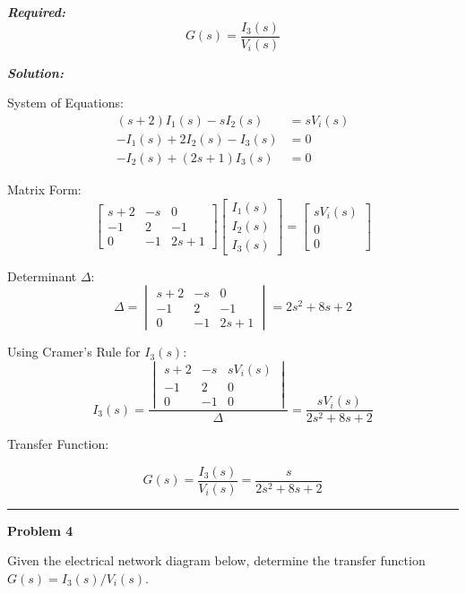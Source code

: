 \documentclass[11pt]{article}
\begin{document}
\noindent \textbf{\textit{Required:}}
\[
G(s) = \frac{I_3(s)}{V_i(s)}
\]

\vspace{12pt}

\noindent \textbf{\textit{Solution:}}

\bigskip

{System of Equations:}
\[
\begin{aligned}
(s + 2)I_1(s) - s I_2(s) &= sV_i(s) \\
-I_1(s) + 2I_2(s) - I_3(s) &= 0 \\
-I_2(s) + (2s + 1)I_3(s) &= 0
\end{aligned}
\]

{Matrix Form:}
\[
\begin{bmatrix}
s + 2 & -s & 0 \\
-1 & 2 & -1 \\
0 & -1 & 2s + 1
\end{bmatrix}
\begin{bmatrix}
I_1(s) \\ I_2(s) \\ I_3(s)
\end{bmatrix}
=
\begin{bmatrix}
sV_i(s) \\ 0 \\ 0
\end{bmatrix}
\]

{Determinant \(\Delta\):}
\[
\Delta =
\begin{vmatrix}
s + 2 & -s & 0 \\
-1 & 2 & -1 \\
0 & -1 & 2s + 1
\end{vmatrix}
= 2s^2 + 8s + 2
\]

{Using Cramer's Rule for \(I_3(s)\):}
\[
I_3(s) =
\frac{
\begin{vmatrix}
s + 2 & -s & sV_i(s) \\
-1 & 2 & 0 \\
0 & -1 & 0
\end{vmatrix}
}
{\Delta}
= \frac{sV_i(s)}{2s^2 + 8s + 2}
\]


{Transfer Function:}

\[
\boxed{
G(s) = \frac{I_3(s)}{V_i(s)} = \frac{s}{2s^2 + 8s + 2}
}
\]


\newpage
  \setcounter{page}{5}
\noindent\rule{\textwidth}{1pt}
\noindent\textbf{Problem 4} \hfill 

\noindent Given the electrical network diagram below, determine the transfer function $G(s) = I_3(s)/V_i(s)$.
\end{document}
